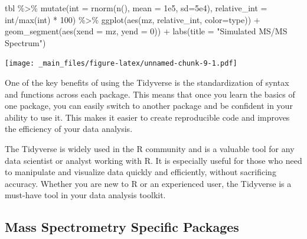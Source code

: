 \documentclass[
]{book}
\newenvironment{Shaded}{\begin{snugshade}}{\end{snugshade}}
\newcommand{\AttributeTok}[1]{\textcolor[rgb]{0.77,0.63,0.00}{#1}}
\newcommand{\DecValTok}[1]{\textcolor[rgb]{0.00,0.00,0.81}{#1}}
\newcommand{\FloatTok}[1]{\textcolor[rgb]{0.00,0.00,0.81}{#1}}
\newcommand{\FunctionTok}[1]{\textcolor[rgb]{0.00,0.00,0.00}{#1}}
\newcommand{\NormalTok}[1]{#1}
\newcommand{\SpecialCharTok}[1]{\textcolor[rgb]{0.00,0.00,0.00}{#1}}
\newcommand{\StringTok}[1]{\textcolor[rgb]{0.31,0.60,0.02}{#1}}
\begin{document}
\begin{Shaded}
\begin{Highlighting}[]
\NormalTok{tbl }\SpecialCharTok{\%\textgreater{}\%}
  \FunctionTok{mutate}\NormalTok{(}\AttributeTok{int =} \FunctionTok{rnorm}\NormalTok{(}\FunctionTok{n}\NormalTok{(), }\AttributeTok{mean =} \FloatTok{1e5}\NormalTok{, }\AttributeTok{sd=}\FloatTok{5e4}\NormalTok{),}
         \AttributeTok{relative\_int =}\NormalTok{ int}\SpecialCharTok{/}\FunctionTok{max}\NormalTok{(int) }\SpecialCharTok{*} \DecValTok{100}\NormalTok{) }\SpecialCharTok{\%\textgreater{}\%}
  \FunctionTok{ggplot}\NormalTok{(}\FunctionTok{aes}\NormalTok{(mz, relative\_int, }\AttributeTok{color=}\NormalTok{type)) }\SpecialCharTok{+}
  \FunctionTok{geom\_segment}\NormalTok{(}\FunctionTok{aes}\NormalTok{(}\AttributeTok{xend =}\NormalTok{ mz, }\AttributeTok{yend =} \DecValTok{0}\NormalTok{)) }\SpecialCharTok{+}
  \FunctionTok{labs}\NormalTok{(}\AttributeTok{title =} \StringTok{"Simulated MS/MS Spectrum"}\NormalTok{)}
\end{Highlighting}
\end{Shaded}

\texttt{[image: \_main\_files/figure-latex/unnamed-chunk-9-1.pdf]}

One of the key benefits of using the Tidyverse is the standardization of syntax and functions across each package. This means that once you learn the basics of one package, you can easily switch to another package and be confident in your ability to use it. This makes it easier to create reproducible code and improves the efficiency of your data analysis.

The Tidyverse is widely used in the R community and is a valuable tool for any data scientist or analyst working with R. It is especially useful for those who need to manipulate and visualize data quickly and efficiently, without sacrificing accuracy. Whether you are new to R or an experienced user, the Tidyverse is a must-have tool in your data analysis toolkit.

\hypertarget{mass-spectrometry-specific-packages}{%
\subsection*{Mass Spectrometry Specific Packages}\label{mass-spectrometry-specific-packages}}
\end{document}

